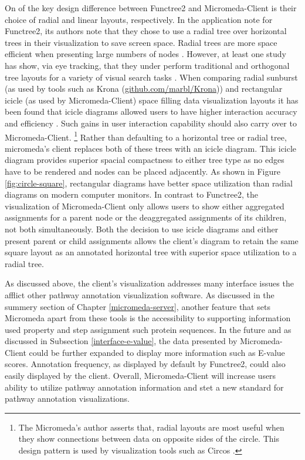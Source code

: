 On of the key design difference between Functree2 and Micromeda-Client is their choice of radial and linear layouts, respectively. In the application note for Functree2, its authors note that they chose to use a radial tree over horizontal trees in their visualization to save screen space. Radial trees are more space efficient when presenting large numbers of nodes \cite{burch2011evaluation}. However, at least one study has show, via eye tracking, that they under perform traditional and orthogonal tree layouts for a variety of visual search tasks \cite{burch2011evaluation}. When comparing radial sunburst (as used by tools such as Krona \cite{ondov2011interactive} (\href{github.com/marbl/Krona}{github.com/marbl/Krona})) and rectangular icicle (as used by Micromeda-Client) space filling data visualization layouts it has been found that icicle diagrams allowed users to have higher interaction accuracy and efficiency \cite{muramalla2017radial}. Such gains in user interaction capability should also carry over to Micromeda-Client. \footnote{The Micromeda's author asserts that, radial layouts are most useful when they show connections between data on opposite sides of the circle. This design pattern is used by visualization tools such as Circos \cite{krzywinski2009circos}.} Rather than defaulting to a horizontal tree or radial tree, micromeda's client replaces both of these trees with an icicle diagram. This icicle diagram provides superior spacial compactness to either tree type as no edges have to be rendered and nodes can be placed adjacently. As shown in Figure \ref{fig:circle-square}, rectangular diagrams have better space utilization than radial diagrams on modern computer monitors. In contrast to Functree2, the visualization of Micromeda-Client only allows users to show either aggregated assignments for a parent node or the deaggregated assignments of its children, not both simultaneously. Both the decision to use icicle diagrams and either present parent or child assignments allows the client's diagram to retain the same square layout as an annotated horizontal tree with superior space utilization to a radial tree. 

As discussed above, the client's visualization addresses many interface issues the afflict other pathway annotation visualization software. As discussed in the summery section of Chapter \ref{micromeda-server}, another feature that sets Micromeda apart from these tools is the accessibility to supporting information used property and step assignment such protein sequences. In the future and as discussed in Subsection \ref{interface-e-value}, the data presented by Micromeda-Client could be further expanded to display more information such as E-value scores. Annotation frequency, as displayed by default by Functree2, could also easily displayed by the client. Overall, Micromeda-Client will increase users ability to utilize pathway annotation information and stet a new standard for pathway annotation visualizations.
